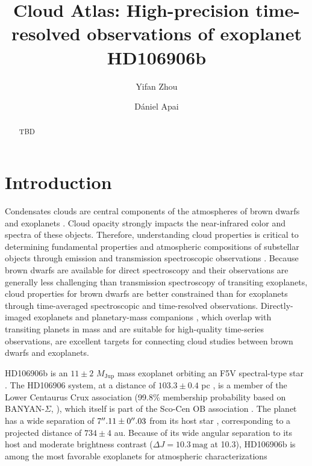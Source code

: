 \documentclass[twocolumn]{aastex62}
\newcommand{\mjup}{\ensuremath{M_\mathrm{Jup}}\xspace}
\begin{document}
\title{Cloud Atlas: High-precision time-resolved observations of exoplanet HD106906b}


\author{Yifan Zhou}

\author{D\'aniel Apai}

\begin{abstract}
TBD
\end{abstract}

\keywords{}

\section{Introduction}

Condensates clouds are central components of the atmospheres of brown dwarfs and exoplanets \citep[e.g.,][]{Morley2012,Marley2013,Marley2015}. Cloud opacity strongly impacts the near-infrared color and spectra of these objects. Therefore, understanding cloud properties is critical to determining  fundamental properties and atmospheric compositions of substellar objects through emission and transmission spectroscopic observations \citep{Ingraham2014, Kreidberg2014a, Stevenson2016, DeWit2016, Samland2017}. Because brown dwarfs are available for direct spectroscopy and their observations are generally less challenging than transmission spectroscopy of transiting exoplanets, cloud properties for brown dwarfs are better constrained than for exoplanets through time-averaged spectroscopic \citep[e.g.,][]{Cushing2008,Stephens2009} and {time-resolved} \citep[e.g.,][]{Buenzli2012,Apai2013,Biller2017,Apai2017} observations. Directly-imaged exoplanets and planetary-mass companions \citep[e.g.,][]{Chauvin2004,Marois2008a,Marois2010,Macintosh2015a}, which overlap with transiting planets in mass and are suitable for high-quality time-series observations, are excellent targets for connecting cloud studies between brown dwarfs and exoplanets.

HD106906b is an $11\pm2$ \mjup{}  mass exoplanet orbiting an F5V spectral-type star \citep{Bailey2013}. The HD106906 system, at a distance of $103.3\pm0.4$ pc \citep{Gaia2016,Gaia2018}, is a member of the Lower Centaurus Crux association (99.8\% membership probability based on BANYAN-$\Sigma$, \citealt{Gagne2018} ), which itself is  part of the Sco-Cen OB association \citep[age: $15\pm3$ Myr,][]{Pecaut2016}. The planet has a wide separation of $7\mbox{$^{\prime\prime}$}.11\pm0\mbox{$^{\prime\prime}$}.03$ from its host star \citep{Bailey2013}, corresponding to a projected distance of $734\pm4$ au. Because of its wide angular separation to its host and moderate brightness contrast ($\Delta J=10.3\,\mathrm{mag}$ at 10.3\arcsec), HD106906b is among the most favorable exoplanets for atmospheric characterizations \citep[e.g., ][]{Bailey2013,Kalas2015,Wu2016,Daemgen2017}
\end{document}
